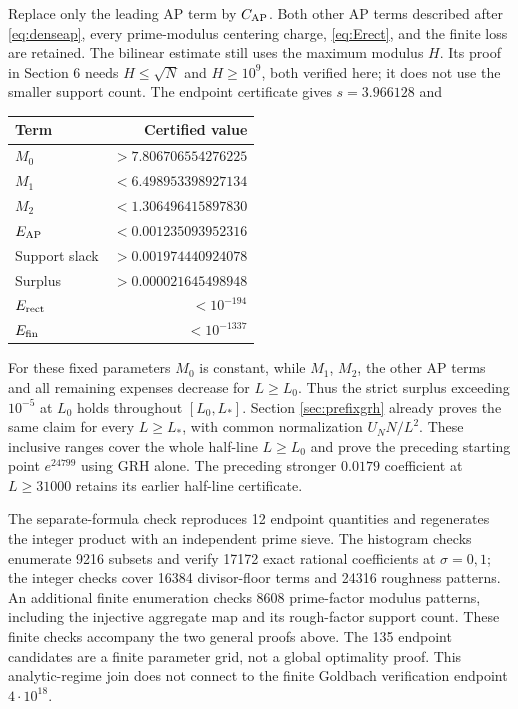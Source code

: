 \documentclass[11pt]{article}
\begin{document}
Replace only the leading AP term by $C_{\rm AP}$.
Both other AP terms described after \eqref{eq:denseap}, every prime-modulus centering
charge, \eqref{eq:Erect}, and the finite loss are retained.
The bilinear estimate still uses the maximum modulus $H$.
Its proof in Section 6 needs $H\le\sqrt N$ and $H\ge10^9$, both verified
here; it does not use the smaller support count.
The endpoint certificate gives $s=3.966128$ and
\begin{center}
\begin{tabular}{lr}\toprule
Term & Certified value\\\midrule
$M_0$ & $>7.806706554276225$\\
$M_1$ & $<6.498953398927134$\\
$M_2$ & $<1.306496415897830$\\
$E_{\rm AP}$ & $<0.001235093952316$\\
Support slack & $>0.001974440924078$\\
Surplus & $>0.000021645498948$\\
$E_{\rm rect}$ & $<10^{-194}$\\
$E_{\rm fin}$ & $<10^{-1337}$\\\bottomrule
\end{tabular}
\end{center}
For these fixed parameters $M_0$ is constant, while $M_1$, $M_2$,
the other AP terms and all remaining expenses decrease for $L\ge L_0$.
Thus the strict surplus exceeding $10^{-5}$ at $L_0$ holds throughout
$[L_0,L_*]$. Section \ref{sec:prefixgrh} already proves the same
claim for every $L\ge L_*$, with common normalization $U_NN/L^2$.
These inclusive ranges cover the whole half-line $L\ge L_0$ and prove
the preceding starting point $e^{24799}$ using GRH alone.
The preceding stronger $0.0179$ coefficient at $L\ge31000$ retains
its earlier half-line certificate.

The separate-formula check reproduces 12 endpoint quantities and
regenerates the integer product with an independent prime sieve.
The histogram checks enumerate 9216 subsets and verify 17172 exact
rational coefficients at $\sigma=0,1$; the integer checks cover 16384
divisor-floor terms and 24316 roughness patterns.
An additional finite enumeration checks 8608 prime-factor modulus patterns,
including the injective aggregate map and its rough-factor support count.
These finite checks accompany the two general proofs above.
The 135 endpoint candidates are a finite parameter grid, not a global
optimality proof. This analytic-regime join does not connect to the
finite Goldbach verification endpoint $4\cdot10^{18}$.
\end{document}
